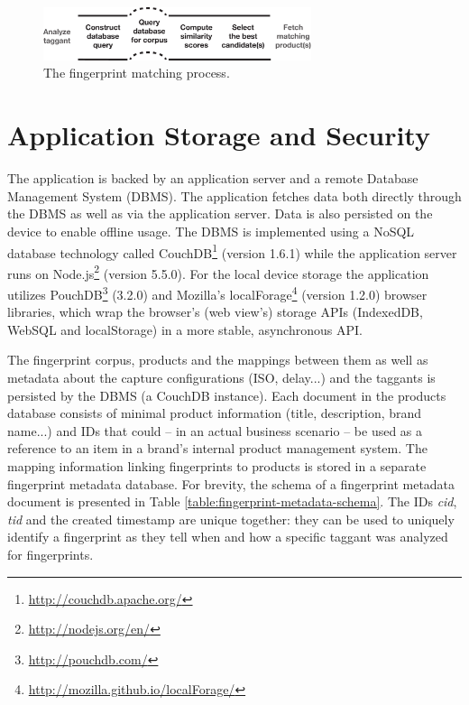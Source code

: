 \documentclass[thesis.tex]{subfiles}
\begin{document}
\begin{figure}[h]
\centering \includegraphics[width=0.7\textwidth,height=\textheight,keepaspectratio=true]{images/design_implementation/matching_process}
\caption{The fingerprint matching process.\label{figure:matching-process}}
\end{figure}

\section{Application Storage and Security}
\label{chapter:storage-security}

The application is backed by an application server and a remote Database Management System (DBMS). The application fetches data both directly through the DBMS as well as via the application server. Data is also persisted on the device to enable offline usage. The DBMS is implemented using a NoSQL database technology called CouchDB\footnote{\url{http://couchdb.apache.org/}} (version 1.6.1) while the application server runs on Node.js\footnote{\url{http://nodejs.org/en/}} (version 5.5.0). For the local device storage the application utilizes PouchDB\footnote{\url{http://pouchdb.com/}} (3.2.0) and Mozilla's localForage\footnote{\url{http://mozilla.github.io/localForage/}} (version 1.2.0) browser libraries, which wrap the browser's (web view's) storage APIs (IndexedDB, WebSQL and localStorage) in a more stable, asynchronous API.

The fingerprint corpus, products and the mappings between them as well as metadata about the capture configurations (ISO, delay...) and the taggants is persisted by the DBMS (a CouchDB instance). Each document in the products database consists of minimal product information (title, description, brand name...) and IDs that could -- in an actual business scenario -- be used as a reference to an item in a brand's internal product management system. The mapping information linking fingerprints to products is stored in a separate fingerprint metadata database. For brevity, the schema of a fingerprint metadata document is presented in Table \ref{table:fingerprint-metadata-schema}. The IDs \emph{cid}, \emph{tid} and the created timestamp are unique together: they can be used to uniquely identify a fingerprint as they tell when and how a specific taggant was analyzed for fingerprints.
\end{document}
